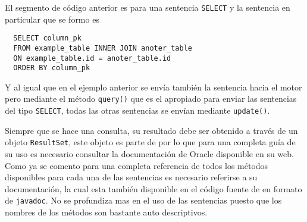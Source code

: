 %
El segmento de código anterior es para una sentencia \verb=SELECT= y la sentencia en particular que se formo es
\begin{Verbatim}
  SELECT column_pk
  FROM example_table INNER JOIN anoter_table
  ON example_table.id = anoter_table.id
  ORDER BY column_pk
\end{Verbatim}
Y al igual que en el ejemplo anterior se envía también la sentencia hacia el motor pero mediante el método \verb=query()= que es el apropiado para enviar las sentencias del tipo \verb=SELECT=, todas las otras sentencias se envían mediante \verb=update()=.

Siempre que se hace una consulta, su resultado debe ser obtenido a través de un objeto \verb=ResultSet=, este objeto es parte de \jd por lo que para una completa guía de su uso es necesario consultar la documentación\citep{java:jdbc:tutorial} de Oracle disponible en su web. Como ya se comento para una completa referencia de todos los métodos disponibles para cada una de las sentencias es necesario referirse a su documentación, la cual esta también disponible en  el código fuente de \jj en formato de \verb=javadoc=. No se profundiza mas en el uso de las sentencias puesto que los nombres de los métodos son bastante auto descriptivos.
%
